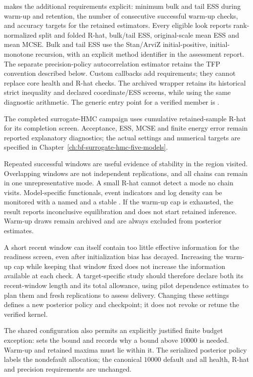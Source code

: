  makes the additional requirements explicit:
minimum bulk and tail ESS during warm-up and retention, the number of
consecutive successful warm-up checks, and accuracy targets for the retained
estimators. Every eligible look reports rank-normalized split and folded R-hat,
bulk/tail ESS, original-scale mean ESS and mean MCSE. Bulk and tail ESS use
the Stan/ArviZ initial-positive, initial-monotone recursion, with an explicit
method identifier in the assessment report. The separate precision-policy
autocorrelation estimator retains the TFP convention described below.
Custom callbacks add
requirements; they cannot replace core health and R-hat checks. The archived
wrapper retains its historical strict inequality and declared coordinate/ESS
screens, while using the same diagnostic arithmetic. The generic entry point
for a verified member is .

The completed surrogate-HMC campaign uses cumulative retained-sample R-hat
for its completion screen. Acceptance, ESS, MCSE and finite energy error remain
reported explanatory diagnostics; the actual settings and numerical targets are
specified in Chapter~\ref{ch:bf-surrogate-hmc-five-models}.

Repeated successful windows are useful evidence of stability in the region
visited. Overlapping windows are not independent replications, and all chains
can remain in one unrepresentative mode. A small R-hat cannot detect a mode no
chain visits. Model-specific functionals, event indicators and log density can
be monitored with a named  and a stable
. If the warm-up cap is exhausted, the result reports
inconclusive equilibration and does not start retained inference. Warm-up draws
remain archived and are always excluded from posterior estimates.

A short recent window can itself contain too little effective information for
the readiness screen, even after initialization bias has decayed. Increasing
the warm-up cap while keeping that window fixed does not increase the
information available at each check. A target-specific study should therefore
declare both its recent-window length and its total allowance, using pilot
dependence estimates to plan them and fresh replications to assess delivery.
Changing these settings defines a new posterior policy and checkpoint; it
does not revoke or retune the verified kernel.

The shared configuration also permits an explicitly justified finite budget
exception:  sets the bound and
 records why a bound above $10000$ is needed.
Warm-up and retained maxima must lie within it. The serialized posterior
policy labels the nondefault allocation; the canonical $10000$ default and
all health, R-hat and precision requirements are unchanged.

